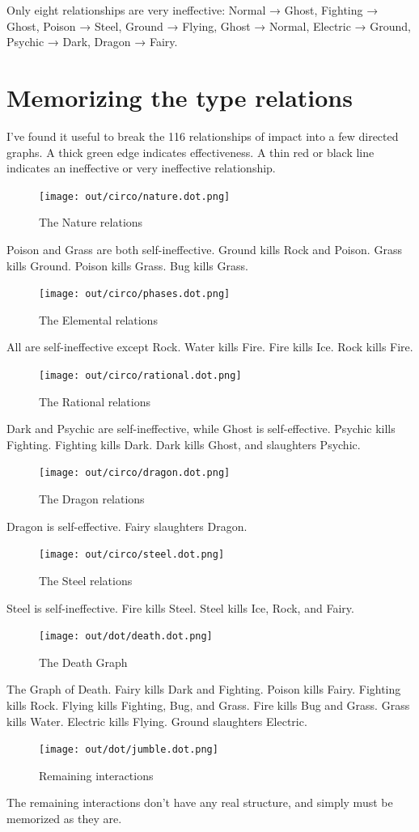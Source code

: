 Only eight relationships are very ineffective:
Normal → Ghost,
Fighting → Ghost,
Poison → Steel,
Ground → Flying,
Ghost → Normal,
Electric → Ground,
Psychic → Dark,
Dragon → Fairy.

\section{Memorizing the type relations}
I've found it useful to break the 116 relationships of impact into a few directed graphs.
A thick green edge indicates effectiveness.
A thin red or black line indicates an ineffective or very ineffective relationship.

\begin{figure}[h]
\centering
\texttt{[image: out/circo/nature.dot.png]}
\caption{The Nature relations}
\end{figure}
Poison and Grass are both self-ineffective.
Ground kills Rock and Poison.
Grass kills Ground.
Poison kills Grass.
Bug kills Grass.

\begin{figure}[h]
\centering
\texttt{[image: out/circo/phases.dot.png]}
\caption{The Elemental relations}
\end{figure}
All are self-ineffective except Rock.
Water kills Fire.
Fire kills Ice.
Rock kills Fire.

\begin{figure}[h]
\centering
\texttt{[image: out/circo/rational.dot.png]}
\caption{The Rational relations}
\end{figure}
Dark and Psychic are self-ineffective, while Ghost is self-effective.
Psychic kills Fighting.
Fighting kills Dark.
Dark kills Ghost, and slaughters Psychic.

\begin{figure}
\centering
\texttt{[image: out/circo/dragon.dot.png]}
\caption{The Dragon relations}
\end{figure}
Dragon is self-effective.
Fairy slaughters Dragon.

\begin{figure}
\centering
\texttt{[image: out/circo/steel.dot.png]}
\caption{The Steel relations}
\end{figure}
Steel is self-ineffective.
Fire kills Steel.
Steel kills Ice, Rock, and Fairy.

\begin{figure}[h]
\centering
\texttt{[image: out/dot/death.dot.png]}
\caption{The Death Graph}
\end{figure}
The Graph of Death.
Fairy kills Dark and Fighting.
Poison kills Fairy.
Fighting kills Rock.
Flying kills Fighting, Bug, and Grass.
Fire kills Bug and Grass.
Grass kills Water.
Electric kills Flying.
Ground slaughters Electric.

\begin{figure}[h]
\centering
\texttt{[image: out/dot/jumble.dot.png]}
\caption{Remaining interactions}
\end{figure}
The remaining interactions don't have any real structure, and simply must be
memorized as they are.
